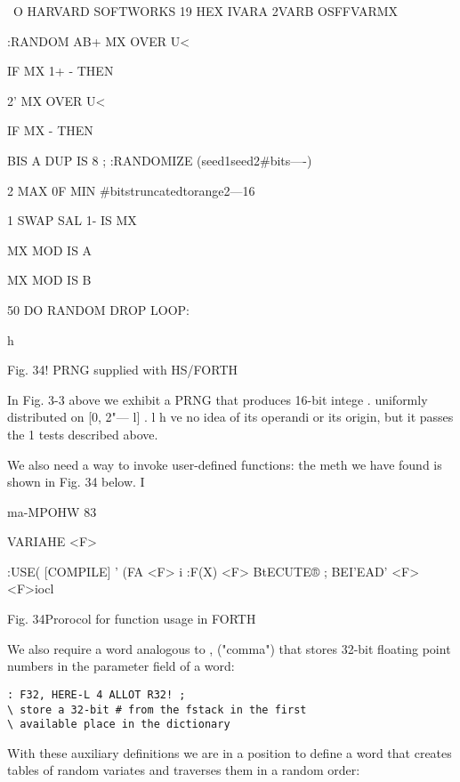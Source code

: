  

 

\ O HARVARD SOFTWORKS 19%
HEX
IVARA 2VARB OSFFVARMX

:RANDOM AB+ MX OVER U<

IF MX 1+ - THEN

2' MX OVER U<

IF MX - THEN

BIS A DUP IS 8 ;
:RANDOMIZE (seed1seed2#bits—-)

2 MAX 0F MIN \#bitstruncatedtorange2—16

1 SWAP SAL 1- IS MX

MX MOD IS A

MX MOD IS B

50 DO RANDOM DROP LOOP:

 

h

Fig. 34! PRNG supplied with HS/FORTH

In Fig. 3-3 above we exhibit a PRNG that produces 16-bit intege .
uniformly distributed on [0, 2"— l] . l h ve no idea of its
operandi or its origin, but it passes the 1 tests described above.

We also need a way to invoke user-defined functions: the meth
we have found is shown in Fig. 34 below. I

ma-MPOHW 83

 

VARIAHE <F>

:USE( [COMPILE] ' (FA <F> i
:F(X) <F> BtECUTE® ;
BEI'EAD' <F> \rrllto<F>iocl

 

 

 

Fig. 34Prorocol for function usage in FORTH

We also require a word analogous to , ("comma") that stores
32-bit floating point numbers in the parameter field of a word:

\begin{verbatim}
: F32, HERE-L 4 ALLOT R32! ;
\ store a 32-bit # from the fstack in the first
\ available place in the dictionary
\end{verbatim}

With these auxiliary definitions we are in a position to define a
word that creates tables of random variates and traverses them in a random order:

